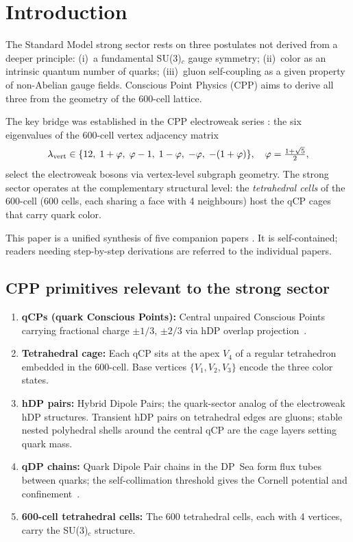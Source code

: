\documentclass[11pt,a4paper]{article}
\newcommand{\phig}{\varphi}
\begin{document}
\tableofcontents
\newpage

\section{Introduction}

The Standard Model strong sector rests on three postulates not
derived from a deeper principle: (i)~a fundamental SU(3)$_c$ gauge
symmetry; (ii)~color as an intrinsic quantum number of quarks;
(iii)~gluon self-coupling as a given property of non-Abelian gauge
fields.  Conscious Point Physics (CPP) aims to derive all three from
the geometry of the 600-cell lattice.

The key bridge was established in the CPP electroweak series
\citep{cpp_ew_unified}: the six eigenvalues of the 600-cell vertex
adjacency matrix
\begin{equation}
\lambda_{\rm vert} \in
\{12,\;1+\phig,\;\phig-1,\;1-\phig,\;-\phig,\;-(1+\phig)\},
\quad\phig = \tfrac{1+\sqrt5}{2},
\label{eq:vertex_spectrum}
\end{equation}
select the electroweak bosons via vertex-level subgraph geometry.
The strong sector operates at the complementary structural level:
the \emph{tetrahedral cells} of the 600-cell (600 cells, each
sharing a face with 4 neighbours) host the qCP cages that carry
quark color.

This paper is a unified synthesis of five companion papers
\citep{cpp_ss1,cpp_ss2,cpp_ss3,cpp_ss4,cpp_ss5}.  It is
self-contained; readers needing step-by-step derivations are
referred to the individual papers.

\subsection{CPP primitives relevant to the strong sector}

\begin{enumerate}
\item \textbf{qCPs (quark Conscious Points):} Central unpaired
  Conscious Points carrying fractional charge $\pm 1/3$, $\pm 2/3$
  via hDP overlap projection~\citep{cpp5014}.
\item \textbf{Tetrahedral cage:} Each qCP sits at the apex $V_4$
  of a regular tetrahedron embedded in the 600-cell.  Base vertices
  $\{V_1, V_2, V_3\}$ encode the three color states.
\item \textbf{hDP pairs:} Hybrid Dipole Pairs; the quark-sector
  analog of the electroweak hDP structures.  Transient hDP pairs
  on tetrahedral edges are gluons; stable nested polyhedral shells
  around the central qCP are the cage layers setting quark mass.
\item \textbf{qDP chains:} Quark Dipole Pair chains in the DP~Sea
  form flux tubes between quarks; the self-collimation threshold
  gives the Cornell potential and confinement~\citep{c14}.
\item \textbf{600-cell tetrahedral cells:} The 600 tetrahedral
  cells, each with 4 vertices, carry the SU(3)$_c$ structure.
\end{enumerate}
\end{document}
